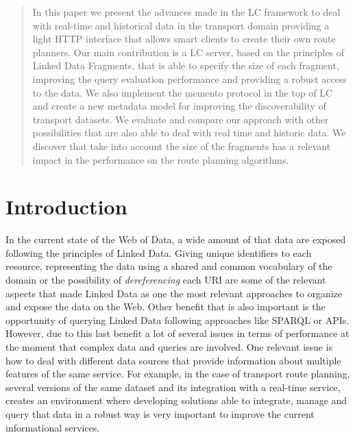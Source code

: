 \documentclass[sw]{iosart2x}
\begin{document}
\begin{frontmatter}
\begin{abstract}
In this paper we present the advances made in the LC framework to deal with real-time and historical data in the transport domain providing a light HTTP interface that allows smart clients to create their own route planners. Our main contribution is a LC server, based on the principles of Linked Data Fragments, that is able to specify the size of each fragment, improving the query evaluation performance and providing a robust access to the data. We also implement the memento protocol in the top of LC and create a new metadata model for improving the discoverability of transport datasets. We evaluate and compare our approach with other possibilities that are also able to deal with real time and historic data. We discover that take into account the size of the fragments has a relevant impact in the performance on the route planning algorithms.  
\end{abstract}

\begin{keyword}
\end{keyword}

\end{frontmatter}



\section{Introduction}\label{introduction} %
In the current state of the Web of Data, a wide amount of that data are exposed following the principles of Linked Data. Giving unique identifiers to each resource, representing the data using a shared and common vocabulary of the domain or the possibility of \textit{dereferencing} each URI are some of the relevant aspects that made Linked Data as one the most relevant approaches to organize and expose the data on the Web. Other benefit that is also important is the opportunity of querying Linked Data following approaches like SPARQL or APIs. However, due to this last benefit a lot of several issues in terms of performance at the moment that complex data and queries are involved. One relevant issue is how to deal with different data sources that provide information about multiple features of the same service. For example, in the case of transport route planning, several versions of the same dataset and its integration with a real-time service, creates an environment where developing solutions able to integrate, manage and query that data in a robust way is very important to improve the current informational services.
\end{document}
